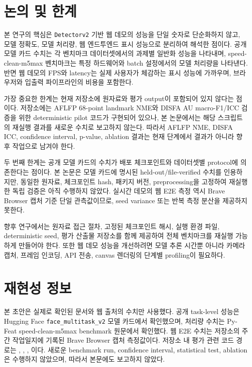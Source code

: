 \documentclass[11pt]{article}
\newcommand{\model}{\texttt{face\_multitask\_v2}}
\newcommand{\detector}{\texttt{Detectorv2}}
\begin{document}
\section{논의 및 한계}

본 연구의 핵심은 \detector{} 기반 웹 데모의 성능을 단일 숫자로 단순화하지 않고, 모델 정확도, 모델 처리량, 웹 엔드투엔드 표시 성능으로 분리하여 해석한 점이다. 공개 모델 카드 수치는 각 벤치마크 데이터셋에서의 과제별 일반화 성능을 나타내며, speed-clean-m5max 벤치마크는 특정 하드웨어와 batch 설정에서의 모델 처리량을 나타낸다. 반면 웹 데모의 FPS와 latency는 실제 사용자가 체감하는 표시 성능에 가까우며, 브라우저와 입출력 파이프라인의 비용을 포함한다.

가장 중요한 한계는 현재 저장소에 원자료와 평가 output이 포함되어 있지 않다는 점이다. 저장소에는 AFLFP 68-point landmark NME와 DISFA AU macro-F1/ICC 검증을 위한 deterministic pilot 코드가 구현되어 있으나, 본 논문에서는 해당 스크립트의 재실행 결과를 새로운 수치로 보고하지 않는다. 따라서 AFLFP NME, DISFA ICC, confidence interval, p-value, ablation 결과는 현재 단계에서 결과가 아니라 향후 작업으로 남겨야 한다.

두 번째 한계는 공개 모델 카드의 수치가 배포 체크포인트와 데이터셋별 protocol에 의존한다는 점이다. 본 논문은 모델 카드에 명시된 held-out/file-verified 수치를 인용하지만, 동일한 원자료, 체크포인트 hash, 패키지 버전, preprocessing을 고정하여 재실행한 독립 검증은 아직 수행하지 않았다. 실시간 데모의 웹 E2E 측정 역시 Brave Browser 캡처 기준 단일 관측값이므로, seed variance 또는 반복 측정 분산을 제공하지 못한다.

향후 연구에서는 원자료 접근 절차, 고정된 체크포인트 해시, 실행 환경 파일, deterministic seed, 평가 산출물 저장소를 함께 제공하여 전체 벤치마크를 재실행 가능하게 만들어야 한다. 또한 웹 데모 성능을 개선하려면 모델 추론 시간뿐 아니라 카메라 캡처, 프레임 인코딩, API 전송, canvas 렌더링의 단계별 profiling이 필요하다.

\section{재현성 정보}

\begin{sloppypar}
본 초안은 실제로 확인된 문서와 웹 출처의 수치만 사용했다. 공개 task-level 성능은 Hugging Face \model{} 모델 카드에서 확인했으며, 처리량 수치는 Py-Feat speed-clean-m5max benchmark 원문에서 확인했다. 웹 E2E 수치는 저장소의 주간 작업일지에 기록된 Brave Browser 캡처 측정값이다. 저장소 내 평가 관련 코드 경로는 , , , 이다. 새로운 benchmark run, confidence interval, statistical test, ablation은 수행하지 않았으며, 따라서 본문에도 보고하지 않았다.
\end{sloppypar}
\end{document}
